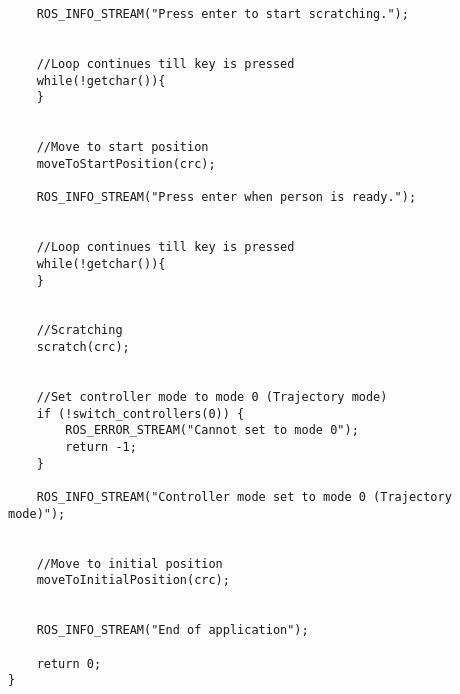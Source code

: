 \begin{lstlisting}
	ROS_INFO_STREAM("Press enter to start scratching.");


	//Loop continues till key is pressed
	while(!getchar()){
	}


	//Move to start position
	moveToStartPosition(crc);
		
	ROS_INFO_STREAM("Press enter when person is ready.");


	//Loop continues till key is pressed
	while(!getchar()){
	}
	

	//Scratching
	scratch(crc);


	//Set controller mode to mode 0 (Trajectory mode)
	if (!switch_controllers(0)) {
		ROS_ERROR_STREAM("Cannot set to mode 0");
		return -1;
	}

	ROS_INFO_STREAM("Controller mode set to mode 0 (Trajectory mode)");


	//Move to initial position
	moveToInitialPosition(crc);


	ROS_INFO_STREAM("End of application");

	return 0;
}

\end{lstlisting}
